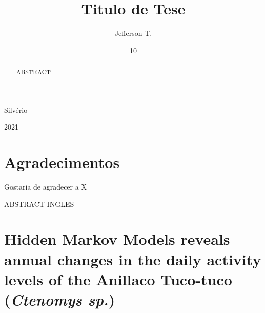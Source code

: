 \documentclass[english,msc,numbers,hidelinks]{coppe}
\begin{document}
  \title{Titulo de Tese}
    \author{Jefferson T.}{Silvério}
  

  \date{10}{2021}
    
  \maketitle

  \frontmatter
  
  \dedication{A alguém cujo valor é digno desta dedicatória.}
    \chapter*{Agradecimentos}
  Gostaria de agradecer a X
  
  \begin{abstract}
  ABSTRACT
  \end{abstract}
  \pagebreak
  \begin{foreignabstract}
  ABSTRACT INGLES
  \end{foreignabstract}
  \tableofcontents
  
    \listoffigures
  
    \listoftables
  
  \printlosymbols
  \printloabbreviations

  \mainmatter
  \hypertarget{hidden-markov-models-reveals-annual-changes-in-the-daily-activity-levels-of-the-anillaco-tuco-tuco-ctenomys-sp.}{%
  \chapter{\texorpdfstring{Hidden Markov Models reveals annual changes in the daily activity levels of the Anillaco Tuco-tuco (\emph{Ctenomys sp.})}{Hidden Markov Models reveals annual changes in the daily activity levels of the Anillaco Tuco-tuco (Ctenomys sp.)}}\label{hidden-markov-models-reveals-annual-changes-in-the-daily-activity-levels-of-the-anillaco-tuco-tuco-ctenomys-sp.}}
\end{document}
